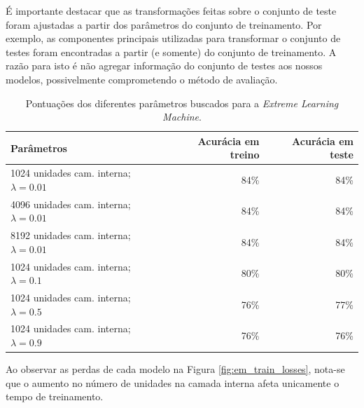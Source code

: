 \documentclass[12pt]{report}
\begin{document}
É importante destacar que as transformações feitas sobre o conjunto de teste foram ajustadas a partir dos parâmetros do conjunto de treinamento. Por exemplo, as componentes principais utilizadas para transformar o conjunto de testes foram encontradas a partir (e somente) do conjunto de treinamento. A razão para isto é não agregar informação do conjunto de testes aos nossos modelos, possivelmente comprometendo o método de avaliação.

\begin{table}[H]
	\centering
	\begin{tabular}{|l|r|r|}
		\hline
		\textbf{Parâmetros} & \textbf{Acurácia em treino} & \textbf{Acurácia em teste} \\\hline
		1024 unidades cam. interna; $\lambda = 0.01$ & 84\% & 84\% \\\hline
		4096 unidades cam. interna; $\lambda = 0.01$ & 84\% & 84\% \\\hline
		8192 unidades cam. interna; $\lambda = 0.01$ & 84\% & 84\% \\\hline
		1024 unidades cam. interna; $\lambda = 0.1$  & 80\% & 80\% \\\hline
		1024 unidades cam. interna; $\lambda = 0.5$  & 76\% & 77\% \\\hline		
		1024 unidades cam. interna; $\lambda = 0.9$  & 76\% & 76\% \\\hline
	\end{tabular}
	\caption{Pontuações dos diferentes parâmetros buscados para a \textit{Extreme Learning Machine}.}
	\label{tbl:lrn_em_scores}
\end{table}

Ao observar as perdas de cada modelo na Figura \ref{fig:em_train_losses}, nota-se que o aumento no número de unidades na camada interna afeta unicamente o tempo de treinamento.
\end{document}
